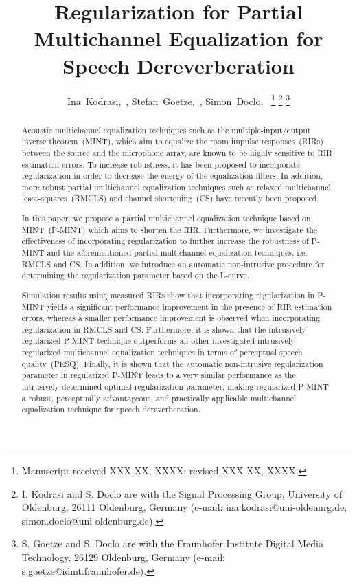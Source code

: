\documentclass[10pt]{IEEEtran}
\begin{document}
%
\title{Regularization for Partial Multichannel Equalization for Speech Dereverberation}

\author{%
  Ina~Kodrasi,~, Stefan~Goetze,~, Simon~Doclo,~%
  \thanks{Manuscript received XXX XX, XXXX; revised XXX XX, XXXX.}%
  \thanks{I. Kodrasi and S. Doclo are with the Signal Processing Group, University of Oldenburg, 26111 Oldenburg, Germany (e-mail: ina.kodrasi@uni-oldenurg.de, simon.doclo@uni-oldenburg.de).}%
  \thanks{S. Goetze and S. Doclo are with the Fraunhofer Institute Digital Media Technology, 26129 Oldenburg, Germany (e-mail: s.goetze@idmt.fraunhofer.de).}%
}


\maketitle
\newpage

\begin{abstract}
\boldmath
Acoustic multichannel equalization techniques such as the multiple-input/output inverse theorem~(MINT), which aim to equalize the room impulse responses~(RIRs) between the source and the microphone array, are known to be highly sensitive to RIR estimation errors.
To increase robustness, it has been proposed to incorporate regularization in order to decrease the energy of the equalization filters.
In addition, more robust partial multichannel equalization techniques such as relaxed multichannel least-squares~(RMCLS) and channel shortening~(CS) have recently been proposed.

In this paper, we propose a partial multichannel equalization technique based on MINT~(P-MINT) which aims to shorten the RIR.
Furthermore, we investigate the effectiveness of incorporating regularization to further increase the robustness of P-MINT and the aforementioned partial multichannel equalization techniques, i.e. RMCLS and CS.
In addition, we introduce an automatic non-intrusive procedure for determining the regularization parameter based on the L-curve.

Simulation results using measured RIRs show that incorporating regularization in P-MINT yields a significant performance improvement in the presence of RIR estimation errors, whereas a smaller performance improvement is observed when incorporating regularization in RMCLS and CS.
Furthermore, it is shown that the intrusively regularized P-MINT technique outperforms all other investigated intrusively regularized multichannel equalization techniques in terms of perceptual speech quality~(PESQ).
Finally, it is shown that the automatic non-intrusive regularization parameter in regularized P-MINT leads to a very similar performance as the intrusively determined optimal regularization parameter, making regularized P-MINT a robust, perceptually advantageous, and practically applicable multichannel equalization technique for speech dereverberation.



\end{abstract}
\end{document}
